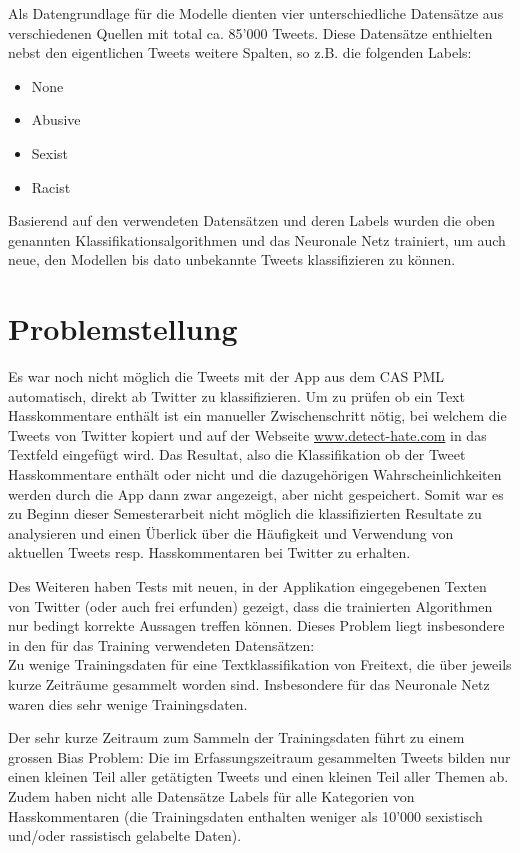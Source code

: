 Als Datengrundlage f{\"u}r die Modelle dienten vier unterschiedliche Datens{\"a}tze aus verschiedenen Quellen mit total ca. 85'000 Tweets. Diese Datens{\"a}tze enthielten nebst den eigentlichen Tweets weitere Spalten, so z.B. die folgenden Labels:
\begin{itemize}
  \item None
  \item Abusive
  \item Sexist
  \item Racist
\end{itemize}
Basierend auf den verwendeten Datens{\"a}tzen und deren Labels wurden die oben genannten Klassifikationsalgorithmen und das Neuronale Netz trainiert, um auch neue, den Modellen bis dato unbekannte Tweets klassifizieren zu k{\"o}nnen. 

\section{Problemstellung }
\label{sec:introduction_	purpose}
Es war noch nicht m{\"o}glich die Tweets mit der App aus dem CAS PML automatisch, direkt ab Twitter zu klassifizieren. Um zu pr{\"u}fen ob ein Text Hasskommentare enth{\"a}lt ist ein manueller Zwischenschritt n{\"o}tig, bei welchem die Tweets von Twitter kopiert und auf der Webseite \href{http://www.detect-hate.com}{www.detect-hate.com} in das Textfeld eingef{\"u}gt wird. Das Resultat, also die Klassifikation ob der Tweet Hasskommentare enth{\"a}lt oder nicht und die dazugeh{\"o}rigen Wahrscheinlichkeiten werden durch die App dann zwar angezeigt, aber nicht gespeichert. Somit war es zu Beginn dieser Semesterarbeit nicht m{\"o}glich die klassifizierten Resultate zu analysieren und einen {\"U}berlick {\"u}ber die H{\"a}ufigkeit und Verwendung von aktuellen Tweets resp. Hasskommentaren bei Twitter zu erhalten.

Des Weiteren haben Tests mit neuen, in der Applikation eingegebenen Texten von Twitter (oder auch frei erfunden) gezeigt, dass die trainierten Algorithmen nur bedingt korrekte Aussagen treffen k{\"o}nnen. Dieses Problem liegt insbesondere in den f{\"u}r das Training verwendeten Datens{\"a}tzen:\\
Zu wenige Trainingsdaten f{\"u}r eine Textklassifikation von Freitext, die {\"u}ber jeweils kurze Zeitr{\"a}ume gesammelt worden sind. Insbesondere f{\"u}r das Neuronale Netz waren dies sehr wenige Trainingsdaten. 

Der sehr kurze Zeitraum zum Sammeln der Trainingsdaten  f{\"u}hrt zu einem grossen Bias Problem: Die im Erfassungszeitraum gesammelten Tweets bilden nur einen kleinen Teil aller get{\"a}tigten Tweets und einen kleinen Teil aller Themen ab. Zudem haben nicht alle Datens{\"a}tze  Labels f{\"u}r alle Kategorien von Hasskommentaren (die Trainingsdaten enthalten weniger als 10'000 sexistisch und/oder rassistisch gelabelte Daten).

